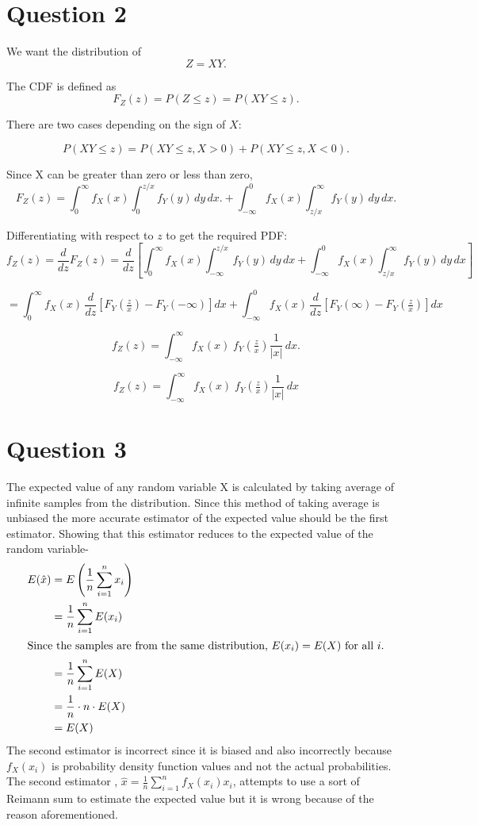 \documentclass[12pt]{article}
\begin{document}
\section{Question 2}
We want the distribution of
\[
Z = XY.
\]

The CDF is defined as
\[
F_Z(z) = P(Z \leq z) = P(XY \leq z).
\]

There are two cases depending on the sign of $X$:

\[
P(XY \leq z) 
= P(XY \leq z, X > 0) + P(XY \leq z, X < 0).
\]

Since X can be greater than zero or less than zero,
\[F_Z(z)=
\int_{0}^{\infty} f_{X}(x) \int_{0}^{z/x} f_{Y}(y) \, dy \, dx.
+
\int_{-\infty}^{0} f_{X}(x) \int_{z/x}^{\infty} f_{Y}(y) \, dy \, dx.
\]

Differentiating with respect to $z$ to get the required PDF:
\[
f_Z(z) = \frac{d}{dz} F_Z(z)
= \frac{d}{dz} \left[
\int_{0}^{\infty} f_X(x) \int_{-\infty}^{z/x} f_Y(y) \, dy \, dx
+ \int_{-\infty}^{0} f_X(x) \int_{z/x}^{\infty} f_Y(y) \, dy \, dx
\right]
\]

\[
= \int_{0}^{\infty} f_X(x) \, \frac{d}{dz}\!\left[ F_Y\!\left(\tfrac{z}{x}\right) - F_Y(-\infty)\right] dx
+ \int_{-\infty}^{0} f_X(x) \, \frac{d}{dz}\!\left[ F_Y(\infty) - F_Y\!\left(\tfrac{z}{x}\right)\right] dx
\]

\[
f_Z(z) = \int_{-\infty}^{\infty} f_{X}(x)\; f_{Y}\!\left(\tfrac{z}{x}\right) \frac{1}{|x|} \, dx.
\]

\[
\boxed{f_Z(z) = \int_{-\infty}^{\infty} f_{X}(x)\; f_{Y}\!\left(\tfrac{z}{x}\right) \frac{1}{|x|} \, dx}
\]


\section{Question 3}
The expected value of any random variable X is calculated by taking average of infinite samples from the distribution. Since this method of taking average is unbiased the more accurate estimator of the expected value should be the first estimator. Showing that this estimator reduces to the expected value of the random variable-
\begin{align*}
E(\hat{x}) &= E\left(\frac{1}{n}\sum_{i=1}^{n}x_i\right) \\
&= \frac{1}{n}\sum_{i=1}^{n}E(x_i) \\
\intertext{Since the samples are from the same distribution, $E(x_i) = E(X)$ for all $i$.}
&= \frac{1}{n}\sum_{i=1}^{n}E(X) \\
&= \frac{1}{n} \cdot n \cdot E(X) \\
&= E(X)
\end{align*}
The second estimator is incorrect since it is biased and also incorrectly because $f_X(x_i)$ is probability density function values and not the actual probabilities. The second estimator , $\hat{x} = \frac{1}{n}\sum_{i=1}^{n}f_X(x_i)x_i$, attempts to use a sort of Reimann sum to estimate the expected value but it is wrong because of the reason aforementioned. 
\end{document}
